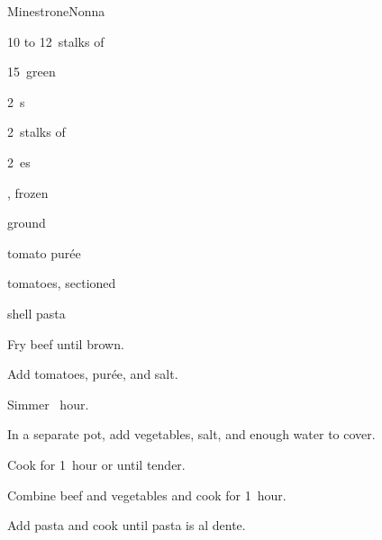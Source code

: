 \begin{recipe}{Minestrone}{Nonna}{}

\begin{ingredients}
\item 10 to 12~stalks of 
\item 15~green 
\item 2~s
\item 2~stalks of 
\item 2~es
\item {} , frozen
\item \lbs{\half} ground 
\item {} tomato pur\'ee
\item tomatoes, sectioned
\item shell pasta
\end{ingredients}

\begin{directions}
\item Fry beef until brown.
\item Add tomatoes, pur\'ee, and salt.
\item Simmer \half~hour.
\item In a separate pot, add vegetables, salt, and enough water to cover.
\item Cook for 1~hour or until tender.
\item Combine beef and vegetables and cook for 1~hour.
\item Add pasta and cook until pasta is al dente.
\end{directions}

\end{recipe}
